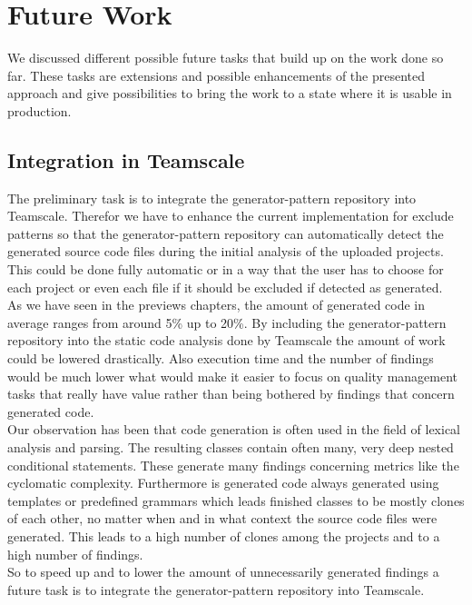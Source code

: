 
\chapter{Future Work}\label{chapter:future}
We discussed different possible future tasks that build up on the work done so far. These tasks are extensions and possible enhancements of the presented approach and give possibilities to bring the work to a state where it is usable in production.

\section{Integration in Teamscale}
The preliminary task is to integrate the generator-pattern repository into Teamscale. Therefor we have to enhance the current implementation for exclude patterns so that the generator-pattern repository can automatically detect the generated source code files during the initial analysis of the uploaded projects. This could be done fully automatic or in a way that the user has to choose for each project or even each file if it should be excluded if detected as generated.\\
As we have seen in the previews chapters, the amount of generated code in average ranges from around 5\% up to 20\%. By including the generator-pattern repository into the static code analysis done by Teamscale the amount of work could be lowered drastically. Also execution time and the number of findings would be much lower what would make it easier to focus on quality management tasks that really have value rather than being bothered by findings that concern generated code.\\
Our observation has been that code generation is often used in the field of lexical analysis and parsing. The resulting classes contain often many, very deep nested conditional statements. These generate many findings concerning metrics like the cyclomatic complexity. Furthermore is generated code always generated using templates or predefined grammars which leads finished classes to be mostly clones of each other, no matter when and in what context the source code files were generated. This leads to a high number of clones among the projects and to a high number of findings.\\
So to speed up and to lower the amount of unnecessarily generated findings a future task is to integrate the generator-pattern repository into Teamscale.

